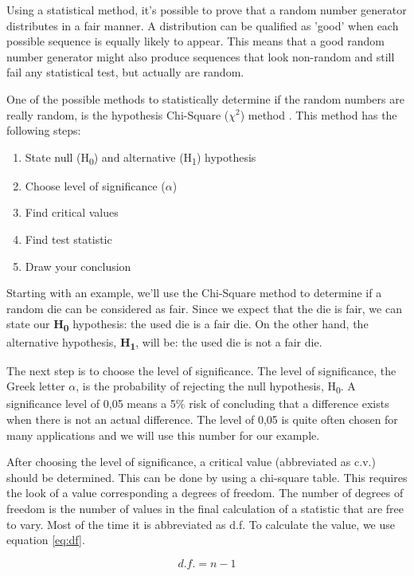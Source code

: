 Using a statistical method, it's possible to prove that a random number generator distributes in a fair manner. A distribution can be qualified as 'good' when each possible sequence is equally likely to appear. This means that a good random number generator might also produce sequences that look non-random and still fail any statistical test, but actually are random.

One of the possible methods to statistically determine if the random numbers are really random, is the hypothesis Chi-Square (${\chi}^2$) method \cite{chisquareRandom} \cite{chisquare}. This method has the following steps:

\begin{enumerate}
	\itemsep0em
	\item State null (H\textsubscript{0}) and alternative (H\textsubscript{1}) hypothesis
	\item Choose level of significance ($\alpha$)
	\item Find critical values
	\item Find test statistic
	\item Draw your conclusion
\end{enumerate}

Starting with an example, we'll use the Chi-Square method to determine if a random die can be considered as fair. Since we expect that the die is fair, we can state our \textbf{H\textsubscript{0}} hypothesis: the used die is a fair die. On the other hand, the alternative hypothesis, \textbf{H\textsubscript{1}}, will be: the used die is not a fair die.

The next step is to choose the level of significance. The level of significance, the Greek letter $\alpha$, is the probability of rejecting the null hypothesis, H\textsubscript{0}. A significance level of 0,05 means a 5\% risk of concluding that a difference exists when there is not an actual difference. The level of 0,05 is quite often chosen for many applications and we will use this number for our example.

After choosing the level of significance, a critical value (abbreviated as c.v.) should be determined. This can be done by using a chi-square table. This requires the look of a value corresponding a degrees of freedom. The number of degrees of freedom is the number of values in the final calculation of a statistic that are free to vary. Most of the time it is abbreviated as d.f. To calculate the value, we use equation \ref{eq:df}.

\begin{equation}\label{eq:df}
d.f. = n - 1
\end{equation}

